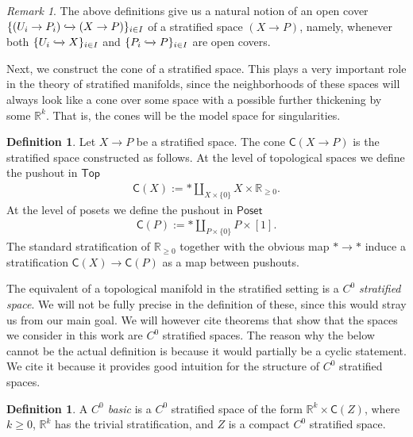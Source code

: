 \documentclass[12pt,a4paper]{article}
\newcounter{counter} \numberwithin{counter}{section}
\theoremstyle{definition}
\newtheorem{definition}[counter]{Definition}
\theoremstyle{plain}
\theoremstyle{remark}
\newtheorem{remark}[counter]{Remark}
\newcommand{\hoint}{\mathbb{R}_{\geq 0}}
\begin{document}
\begin{remark}
    The above definitions give us a natural notion of an open cover $\{ (U_i \rightarrow P_i) \xhookrightarrow{} (X \rightarrow P)\}_{i \in I}$ of a stratified space $(X \rightarrow P)$, namely, whenever both $\{ U_i \xhookrightarrow{} X\}_{i \in I}$ and $\{ P_i \xhookrightarrow{} P \}_{i \in I}$ are open covers.
\end{remark}

Next, we construct the cone of a stratified space. This plays a very important role in the theory of stratified manifolds, since the neighborhoods of these spaces will always look like a cone over some space with a possible further thickening by some $\mathbb{R}^k$. That is, the cones will be the model space for singularities.

\begin{definition}
    Let $X \rightarrow P$ be a stratified space. The cone $\mathsf{C}(X \rightarrow P)$ is the stratified space constructed as follows. At the level of topological spaces we define the pushout in $\mathsf{Top}$
    \begin{align}
        \mathsf{C}(X) := * \coprod_{X \times \{0\}} X \times \hoint.
    \end{align}
    At the level of posets we define the pushout in $\mathsf{Poset}$
    \begin{align}
        \mathsf{C}(P) := * \coprod_{P \times \{ 0\}} P \times [1].
    \end{align}
    The standard stratification of $\hoint$ together with the obvious map $* \rightarrow *$ induce a stratification $\mathsf{C}(X) \rightarrow \mathsf{C}(P)$ as a map between pushouts. 
\end{definition}

The equivalent of a topological manifold in the stratified setting is a \emph{$C^0$ stratified space}. We will not be fully precise in the definition of these, since this would stray us from our main goal. We will however cite theorems that show that the spaces we consider in this work are $C^0$ stratified spaces. The reason why the below cannot be the actual definition is because it would partially be a cyclic statement. We cite it because it provides good intuition for the structure of $C^0$ stratified spaces.

\begin{definition}
    A \emph{$C^0$ basic} is a $C^0$ stratified space of the form $\mathbb{R}^k \times \mathsf{C}(Z)$, where $k \geq 0$, $\mathbb{R}^k$ has the trivial stratification, and $Z$ is a compact $C^0$ stratified space.
\end{definition}
\end{document}
